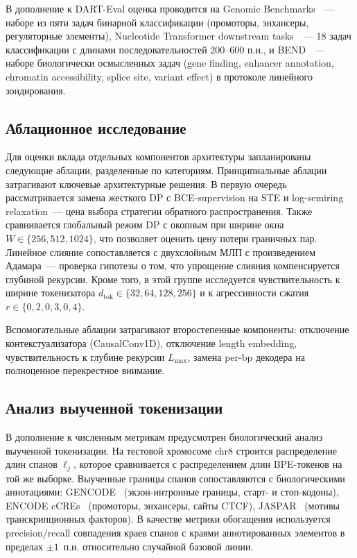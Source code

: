 В дополнение к DART-Eval оценка проводится на
Genomic Benchmarks~\cite{gresovaGenomicBenchmarksCollection2023}~--- наборе
из пяти задач бинарной классификации (промоторы, энхансеры,
регуляторные элементы),
Nucleotide Transformer downstream tasks~\cite{dalla-torreNucleotideTransformerBuilding2025}~---
18 задач классификации с длинами последовательностей 200--600 п.н., и
BEND~\cite{tangBENDBenchmarkDNA2024}~--- наборе биологически осмысленных
задач (gene finding, enhancer annotation, chromatin accessibility,
splice site, variant effect) в протоколе линейного зондирования.

\subsection{Аблационное исследование}

Для оценки вклада отдельных компонентов архитектуры запланированы
следующие аблации, разделенные по категориям. Принципиальные
аблации затрагивают ключевые архитектурные решения. В первую очередь
рассматривается замена жесткого DP с BCE-supervision на STE и
log-semiring relaxation~--- цена выбора стратегии обратного
распространения. Также сравнивается глобальный режим DP с окопным при
ширине окна $W \in \{256, 512, 1024\}$, что позволяет оценить цену
потери граничных пар. Линейное слияние сопоставляется с двухслойным
МЛП с произведением Адамара~--- проверка гипотезы о том, что
упрощение слияния компенсируется глубиной рекурсии. Кроме того, в этой
группе исследуется чувствительность к ширине токенизатора $d_{\text{tok}}
\in \{32, 64, 128, 256\}$ и к агрессивности сжатия $r \in \{0{,}2,
0{,}3, 0{,}4\}$.

Вспомогательные аблации затрагивают второстепенные компоненты:
отключение контекстуализатора (CausalConv1D), отключение length
embedding, чувствительность к глубине рекурсии $L_{\max}$, замена
per-bp декодера на полноценное перекрестное внимание.

\subsection{Анализ выученной токенизации}

В дополнение к численным метрикам предусмотрен биологический анализ
выученной токенизации. На тестовой хромосоме chr8 строится распределение
длин спанов $\ell_j$, которое сравнивается с распределением длин
BPE-токенов на той же выборке. Выученные границы спанов сопоставляются
с биологическими аннотациями: GENCODE~\cite{frankishGENCODE2019}
(экзон-интронные границы, старт- и стоп-кодоны), ENCODE
cCREs~\cite{encodeExpandedRegistry2024} (промоторы, энхансеры, сайты
CTCF), JASPAR~\cite{rauluseviciuteJASPAR2024} (мотивы транскрипционных
факторов). В качестве метрики обогащения используется precision/recall
совпадения краев спанов с краями аннотированных элементов в пределах
$\pm 1$~п.н. относительно случайной базовой линии.

